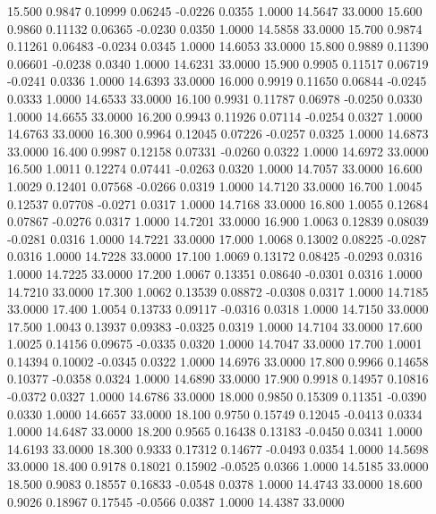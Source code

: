   15.500   0.9847   0.10999   0.06245  -0.0226   0.0355   1.0000  14.5647  33.0000
  15.600   0.9860   0.11132   0.06365  -0.0230   0.0350   1.0000  14.5858  33.0000
  15.700   0.9874   0.11261   0.06483  -0.0234   0.0345   1.0000  14.6053  33.0000
  15.800   0.9889   0.11390   0.06601  -0.0238   0.0340   1.0000  14.6231  33.0000
  15.900   0.9905   0.11517   0.06719  -0.0241   0.0336   1.0000  14.6393  33.0000
  16.000   0.9919   0.11650   0.06844  -0.0245   0.0333   1.0000  14.6533  33.0000
  16.100   0.9931   0.11787   0.06978  -0.0250   0.0330   1.0000  14.6655  33.0000
  16.200   0.9943   0.11926   0.07114  -0.0254   0.0327   1.0000  14.6763  33.0000
  16.300   0.9964   0.12045   0.07226  -0.0257   0.0325   1.0000  14.6873  33.0000
  16.400   0.9987   0.12158   0.07331  -0.0260   0.0322   1.0000  14.6972  33.0000
  16.500   1.0011   0.12274   0.07441  -0.0263   0.0320   1.0000  14.7057  33.0000
  16.600   1.0029   0.12401   0.07568  -0.0266   0.0319   1.0000  14.7120  33.0000
  16.700   1.0045   0.12537   0.07708  -0.0271   0.0317   1.0000  14.7168  33.0000
  16.800   1.0055   0.12684   0.07867  -0.0276   0.0317   1.0000  14.7201  33.0000
  16.900   1.0063   0.12839   0.08039  -0.0281   0.0316   1.0000  14.7221  33.0000
  17.000   1.0068   0.13002   0.08225  -0.0287   0.0316   1.0000  14.7228  33.0000
  17.100   1.0069   0.13172   0.08425  -0.0293   0.0316   1.0000  14.7225  33.0000
  17.200   1.0067   0.13351   0.08640  -0.0301   0.0316   1.0000  14.7210  33.0000
  17.300   1.0062   0.13539   0.08872  -0.0308   0.0317   1.0000  14.7185  33.0000
  17.400   1.0054   0.13733   0.09117  -0.0316   0.0318   1.0000  14.7150  33.0000
  17.500   1.0043   0.13937   0.09383  -0.0325   0.0319   1.0000  14.7104  33.0000
  17.600   1.0025   0.14156   0.09675  -0.0335   0.0320   1.0000  14.7047  33.0000
  17.700   1.0001   0.14394   0.10002  -0.0345   0.0322   1.0000  14.6976  33.0000
  17.800   0.9966   0.14658   0.10377  -0.0358   0.0324   1.0000  14.6890  33.0000
  17.900   0.9918   0.14957   0.10816  -0.0372   0.0327   1.0000  14.6786  33.0000
  18.000   0.9850   0.15309   0.11351  -0.0390   0.0330   1.0000  14.6657  33.0000
  18.100   0.9750   0.15749   0.12045  -0.0413   0.0334   1.0000  14.6487  33.0000
  18.200   0.9565   0.16438   0.13183  -0.0450   0.0341   1.0000  14.6193  33.0000
  18.300   0.9333   0.17312   0.14677  -0.0493   0.0354   1.0000  14.5698  33.0000
  18.400   0.9178   0.18021   0.15902  -0.0525   0.0366   1.0000  14.5185  33.0000
  18.500   0.9083   0.18557   0.16833  -0.0548   0.0378   1.0000  14.4743  33.0000
  18.600   0.9026   0.18967   0.17545  -0.0566   0.0387   1.0000  14.4387  33.0000
